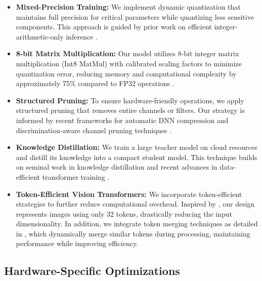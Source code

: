 \documentclass[11pt, oneside]{article}   	%
\begin{document}
\begin{itemize}
	\item \textbf{Mixed-Precision Training:} We implement dynamic quantization that maintains full precision for critical parameters while quantizing less sensitive components. This approach is guided by prior work on efficient integer-arithmetic-only inference \cite{jacob2017quantizationtrainingneuralnetworks}.
	
	\item \textbf{8-bit Matrix Multiplication:} Our model utilizes 8-bit integer matrix multiplication (Int8 MatMul) with calibrated scaling factors to minimize quantization error, reducing memory and computational complexity by approximately 75\% compared to FP32 operations \cite{jacob2017quantizationtrainingneuralnetworks}.
	
	\item \textbf{Structured Pruning:} To ensure hardware-friendly operations, we apply structured pruning that removes entire channels or filters. Our strategy is informed by recent frameworks for automatic DNN compression \cite{liu2019autocompressautomaticdnnstructured} and discrimination-aware channel pruning techniques \cite{zhuang2019discriminationawarechannelpruningdeep}.
	
	\item \textbf{Knowledge Distillation:} We train a large teacher model on cloud resources and distill its knowledge into a compact student model. This technique builds on seminal work in knowledge distillation \cite{hinton2015distillingknowledgeneuralnetwork} and recent advances in data-efficient transformer training \cite{touvron2021trainingdataefficientimagetransformers}.
	
	\item \textbf{Token-Efficient Vision Transformers:} We incorporate token-efficient strategies to further reduce computational overhead. Inspired by \cite{yu2024imageworth32tokens}, our design represents images using only 32 tokens, drastically reducing the input dimensionality. In addition, we integrate token merging techniques as detailed in \cite{bolya2023tokenmergingvitfaster}, which dynamically merge similar tokens during processing, maintaining performance while improving efficiency.
\end{itemize}

\subsection*{Hardware-Specific Optimizations}
\end{document}
